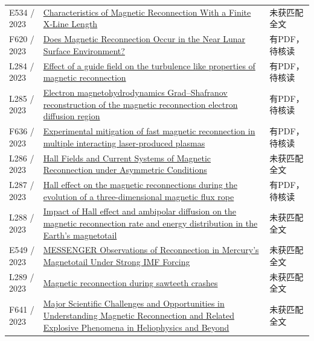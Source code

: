 \begin{longtable}{P{24mm}P{97mm}P{27mm}}
E534 / 2023 & \href{https://doi.org/10.1029/2022ja031209}{Characteristics of Magnetic Reconnection With a Finite X‐Line Length} & 未获匹配全文\\

F620 / 2023 & \href{https://doi.org/10.1029/2023gl104733}{Does Magnetic Reconnection Occur in the Near Lunar Surface Environment?} & 有PDF，待核读\\

L284 / 2023 & \href{https://doi.org/10.1063/5.0150929}{Effect of a guide field on the turbulence like properties of magnetic reconnection} & 有PDF，待核读\\

L285 / 2023 & \href{https://doi.org/10.3389/fspas.2023.1069888}{Electron magnetohydrodynamics Grad–Shafranov reconstruction of the magnetic reconnection electron diffusion region} & 有PDF，待核读\\

F636 / 2023 & \href{https://doi.org/10.48550/arxiv.2305.05701}{Experimental mitigation of fast magnetic reconnection in multiple interacting laser-produced plasmas} & 有PDF，待核读\\

L286 / 2023 & \href{https://doi.org/10.3847/1538-4357/aca760}{Hall Fields and Current Systems of Magnetic Reconnection under Asymmetric Conditions} & 未获匹配全文\\

L287 / 2023 & \href{https://doi.org/10.1088/1402-4896/acd3bb}{Hall effect on the magnetic reconnections during the evolution of a three-dimensional magnetic flux rope} & 有PDF，待核读\\

L288 / 2023 & \href{https://noesis.uis.edu.co/handle/20.500.14071/12490}{Impact of Hall effect and ambipolar diffusion on the magnetic reconnection rate and energy distribution in the Earth’s magnetotail} & 未获匹配全文\\

E549 / 2023 & \href{https://doi.org/10.1029/2022ja031134}{MESSENGER Observations of Reconnection in Mercury's Magnetotail Under Strong IMF Forcing} & 未获匹配全文\\

L289 / 2023 & \href{https://doi.org/10.1063/5.0169243}{Magnetic reconnection during sawteeth crashes} & 未获匹配全文\\

F641 / 2023 & \href{https://doi.org/10.3847/25c2cfeb.e22a8d1f}{Major Scientific Challenges and Opportunities in Understanding Magnetic Reconnection and Related Explosive Phenomena in Heliophysics and Beyond} & 未获匹配全文\\


\end{longtable}
